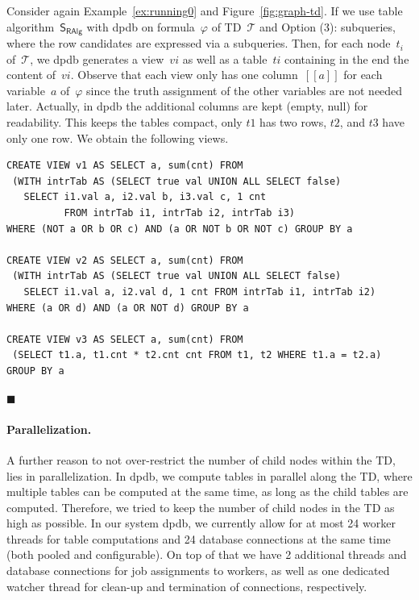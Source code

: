 \documentclass{llncs}
\newcommand{\cid}[1]{\ensuremath{[\![#1]\!]}}
\newcommand{\dpdb}{{\small\textsf{dpdb}}\xspace}
\newcommand{\tab}[1]{\ensuremath{\tau_{#1}}}
\renewenvironment{example}{\begin{EXa}}{\hfill\ensuremath{\blacksquare}\end{EXa}}
\begin{document}
\begin{example}\label{ex:dbviews}
Consider again Example~\ref{ex:running0} and Figure~\ref{fig:graph-td}.
If we use table algorithm~$\mathsf{S_{RAlg}}$ with \dpdb on formula~$\varphi$ of TD~$\mathcal{T}$ and Option (3): subqueries, where the row candidates are expressed via a subqueries. Then, for each node~$t_i$ of~$\mathcal{T}$, we \dpdb generates a view~$vi$ 
as well as a table~$ti$ containing in the end the content of~$vi$.
Observe that each view only has one column~$\cid{a}$ for each variable~$a$ of~$\varphi$ since the
truth assignment of the other variables are not needed later.
Actually, in \dpdb the additional columns are kept (empty, null) for readability.
This keeps the tables compact, only $t1$ has two rows, $t2$, and $t3$ have only one row.
We obtain the following views.
%
\begin{verbatim}
CREATE VIEW v1 AS SELECT a, sum(cnt) FROM 
 (WITH intrTab AS (SELECT true val UNION ALL SELECT false)
   SELECT i1.val a, i2.val b, i3.val c, 1 cnt 
          FROM intrTab i1, intrTab i2, intrTab i3)  
WHERE (NOT a OR b OR c) AND (a OR NOT b OR NOT c) GROUP BY a

CREATE VIEW v2 AS SELECT a, sum(cnt) FROM 
 (WITH intrTab AS (SELECT true val UNION ALL SELECT false) 
   SELECT i1.val a, i2.val d, 1 cnt FROM intrTab i1, intrTab i2) 
WHERE (a OR d) AND (a OR NOT d) GROUP BY a

CREATE VIEW v3 AS SELECT a, sum(cnt) FROM 
 (SELECT t1.a, t1.cnt * t2.cnt cnt FROM t1, t2 WHERE t1.a = t2.a)
GROUP BY a\end{verbatim}%
\vspace{-2em}
\end{example}%


\paragraph*{Parallelization.} A further reason to not over-restrict the number of child nodes within the TD, lies in parallelization.
In \dpdb, we compute tables in parallel along the TD,
where multiple tables can be computed at the same time,
as long as the child tables are computed.
Therefore, we tried to keep the number of child nodes in the TD as high as possible.
In our system \dpdb, we currently allow 
for at most 24 worker threads for table computations and 24 database connections at the same time (both pooled and configurable).
On top of that we have 2 additional threads and database connections for job assignments to workers, as well as one dedicated watcher thread for clean-up and termination of connections, respectively.
\end{document}
